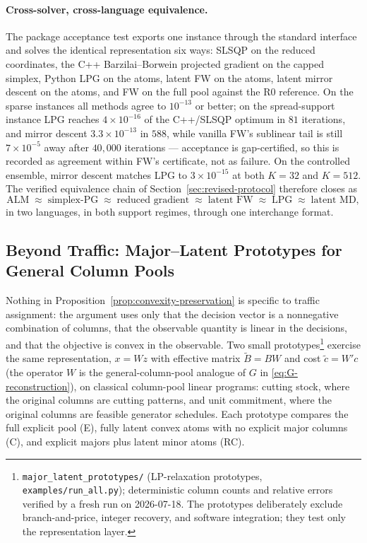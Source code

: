 \paragraph{Cross-solver, cross-language equivalence.}
The package acceptance test exports one instance through the standard
interface and solves the identical representation six ways: SLSQP on
the reduced coordinates, the C++ Barzilai--Borwein projected gradient
on the capped simplex, Python LPG on the atoms, latent FW on the atoms,
latent mirror descent on the atoms, and FW on the full pool against the
R0 reference. On the sparse instances all methods agree to $10^{-13}$
or better; on the spread-support instance LPG reaches
$4 \times 10^{-16}$ of the C++/SLSQP optimum in $81$ iterations, and
mirror descent $3.3 \times 10^{-13}$ in $588$, while vanilla FW's
sublinear tail is still $7 \times 10^{-5}$ away after $40{,}000$
iterations --- acceptance is gap-certified, so this is recorded as
agreement within FW's certificate, not as failure. On the controlled
ensemble, mirror descent matches LPG to $3 \times 10^{-15}$ at both
$K = 32$ and $K = 512$. The verified equivalence chain of
Section~\ref{sec:revised-protocol} therefore closes as
\begin{equation*}
\text{ALM} \;\approx\; \text{simplex-PG} \;\approx\;
\text{reduced gradient} \;\approx\; \text{latent FW}
\;\approx\; \text{LPG} \;\approx\; \text{latent MD},
\end{equation*}
in two languages, in both support regimes, through one interchange
format.

\subsection{Beyond Traffic: Major--Latent Prototypes for General Column Pools}
\label{sec:beyond-traffic}

Nothing in Proposition~\ref{prop:convexity-preservation} is specific to
traffic assignment: the argument uses only that the decision vector is a
nonnegative combination of columns, that the observable quantity is linear in
the decisions, and that the objective is convex in the observable. Two small
prototypes\footnote{\texttt{major\_latent\_prototypes/} (LP-relaxation
prototypes, \texttt{examples/run\_all.py}); deterministic column counts and
relative errors verified by a fresh run on 2026-07-18. The prototypes
deliberately exclude branch-and-price, integer recovery, and software
integration; they test only the representation layer.} exercise the same
representation, $x = Wz$ with effective matrix $\widetilde B = BW$ and cost
$\widetilde c = W' c$ (the operator $W$ is the general-column-pool analogue of
$G$ in \eqref{eq:G-reconstruction}), on classical column-pool linear programs:
cutting stock, where the original columns are cutting patterns, and unit
commitment, where the original columns are feasible generator schedules. Each
prototype compares the full explicit pool (E), fully latent convex atoms with
no explicit major columns (C), and explicit majors plus latent minor atoms
(RC).


